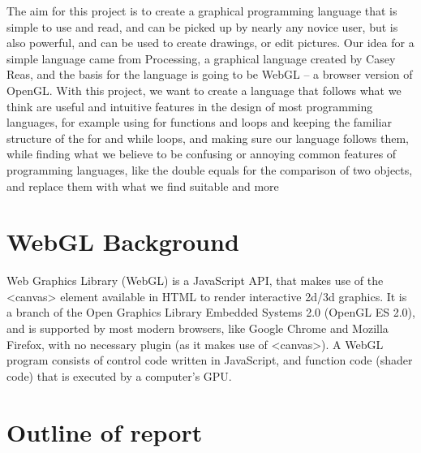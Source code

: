 \documentclass{l3proj}
\begin{document}
The aim for this project is to create a graphical programming language that is simple to use and read, and can be picked up by nearly any novice user, but is also powerful, and can be used to create drawings, or edit pictures. Our idea for a simple language came from Processing, a graphical language created by Casey Reas, and the basis for the language is going to be WebGL – a browser version of OpenGL. With this project, we want to create a language that follows what we think are useful and intuitive features in the design of most programming languages, for example using {} for functions and loops and keeping the familiar structure of the for and while loops, and making sure our language follows them, while finding what we believe to be confusing or annoying common features of programming languages, like the double equals for the comparison of two objects, and replace them with what we find suitable and more 

\section{WebGL Background}

Web Graphics Library (WebGL) is a JavaScript API, that makes use of the <canvas> element available in HTML to render interactive 2d/3d graphics. It is a branch of the Open Graphics Library Embedded Systems 2.0 (OpenGL ES 2.0), and is supported by most modern browsers, like Google Chrome and Mozilla Firefox, with no necessary plugin (as it makes use of <canvas>). A WebGL program consists of control code written in JavaScript, and function code (shader code) that is executed by a computer's GPU. 

\section{Outline of report}
\end{document}

